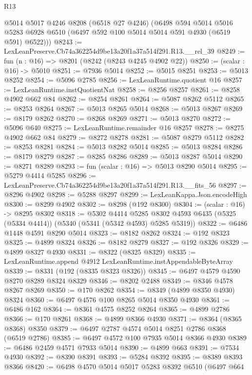 \begin{lexlean}{R13}
\begin{coremodule}
      @5014
      @5017
      @4246
      @8208
      (@6518 @27 @4246)
      (@6498
        @594
        @5014
        @5016
        @5283
        @6928
        @6510
        (@6497 @592 @100 @5014 @5014 @591 @4930 (@6519 @591) @6522)))
@8243 := LexLeanPreserve.Cb74a362254d9be13a20f1a37a514f291.R13.__rel_39
@8249 := fun (n : @16) => @8201 (@8242 (@8243 @4245 @4902 @22))
@8250 := (scalar : @16) -> @5010
@8251 := @7936 @5014
@8252 := @5015 @8251
@8253 := @5013 @8252
@8254 := @5096 @2785
@8256 := LexLeanRuntime.quotient @16
@8257 := LexLeanRuntime.instQuotientNat
@8258 := @8256 @8257
@8261 := @8258 @4902 @662 @84
@8262 := @8254 @8261
@8264 := @5087 @8262 @5112
@8265 := @8253 @8264
@8267 := @5013 @8265 @5014
@8268 := @5013 @8267
@8269 := @8179 @8262
@8270 := @8268 @8269
@8271 := @5013 @8270
@8272 := @5096 @640
@8275 := LexLeanRuntime.remainder @16 @8257
@8278 := @8275 @4902 @662 @84
@8279 := @8272 @8278
@8281 := @5087 @8279 @5112
@8282 := @8253 @8281
@8284 := @5013 @8282 @5014
@8285 := @5013 @8284
@8286 := @8179 @8279
@8287 := @8285 @8286
@8289 := @5013 @8287 @5014
@8290 := @8271 @8289
@8293 := fun (scalar : @16) => @5013 @8290 @5014
@8295 := @5279 @4414 @5285
@8296 := LexLeanPreserve.Cb74a362254d9be13a20f1a37a514f291.R13.__fits_56
@8297 := @8296 @4902
@8298 := @5288 @8297
@8299 := LexLeanKappa.Json.encodeHigh
@8300 := @8299 @4902
@8302 := @8298 (@192 @8300)
@8304 := (scalar : @16) -> @8295 @8302
@8318 := @5302
    @4414
    @5285
    @8302
    @4593
    @6435
    (@5325 (@5334 @4414))
    (@5340 (@5341 (@5342 @4593) @5285 @5319))
@8322 := @6486 @1448 @4591 @8290 @5014
@8323 := @8182 @8262
@8324 := @192 @8323
@8325 := @4899 @8324
@8326 := @8182 @8279
@8327 := @192 @8326
@8329 := @4899 @8327 @4930
@8331 := @8322 (@8325 @8329)
@8335 := LexLeanRuntime.append @4912 LexLeanRuntime.instAppendableByteArray
@8339 := @8331 (@192 (@8335 @8323 @8326))
@8345 := @6497 @4579 @4590 @8270 @8289 @8324 @8329
@8346 := @8202 @2488
@8349 := @8346 @4578 @8267 @8269
@8350 := @170 @8262
@8354 := @8349 (@4899 @8350 @4930) @8324
@8360 := @6497 @4576 @100 @8265 @5014 @8350 @4930
@8361 := @6486 @162
@8364 := @8361 @4575 @8252 @8264
@8365 := @4899 @2786
@8366 := @170 @8261
@8368 := @4899 @8366 @4930
@8371 := @8364 (@8365 @8368) @8350
@8379 := @6497 @2787 @4574 @5014 @8251 @2786 @8368 (@6519 @2786)
@8385 := @6497 @4572 @100 @7935 @5014 @8366 @4930
@8389 := @6486 @2459 @4571 @7933 @5014
@8390 := @4899 @663
@8391 := @7534 @4930
@8392 := @8390 @8391
@8393 := @5284 @8392
@8395 := @8389 @8393 @8366
@8420 := @6498
    @4570
    @5014
    @5017
    @5283
    @8392
    @6510
    (@6497
      @664

\end{coremodule}
\end{lexlean}
